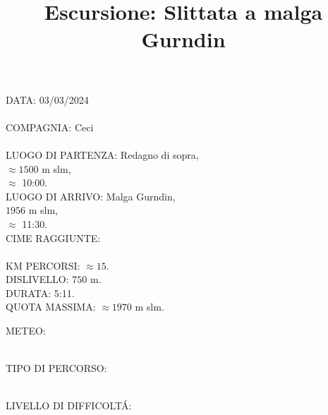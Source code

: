 \documentclass{article}
\title{\Huge Escursione: Slittata a malga Gurndin}
\date{}
\author{}
\begin{document}




\maketitle

\begin{minipage}[t]{0.5\textwidth}
    \faCalendar* DATA: 03/03/2024\\
    \\
    \faSmile[regular] COMPAGNIA: Ceci \faHeart\\
    \\
    \faMapPin[regular] LUOGO DI PARTENZA: Redagno di sopra, \\
    \hspace*{4cm} $\approx 1500$ m slm,\\
    \hspace*{4cm} $\approx$ 10:00.
    \\
    \faMapPin[regular] LUOGO DI ARRIVO: Malga Gurndin,\\
    \hspace*{3.5cm} $1956$ m slm,\\
    \hspace*{3.5cm} $\approx$ 11:30.
    \\
    \faMountain[regular] CIME RAGGIUNTE:\\
    \vspace*{1cm}\\
    KM PERCORSI: $\approx 15$. \\
    DISLIVELLO: $750$ m.\\
    DURATA: 5:11.\\
    QUOTA MASSIMA: $\approx 1970$ m slm.\\
\end{minipage} 
\begin{minipage}[t]{0.4\textwidth}
    METEO: \\ \\

    TIPO DI PERCORSO: \\ \\

    LIVELLO DI DIFFICOLT\'A: \\ \\

\end{minipage}
\centering
\end{document}

